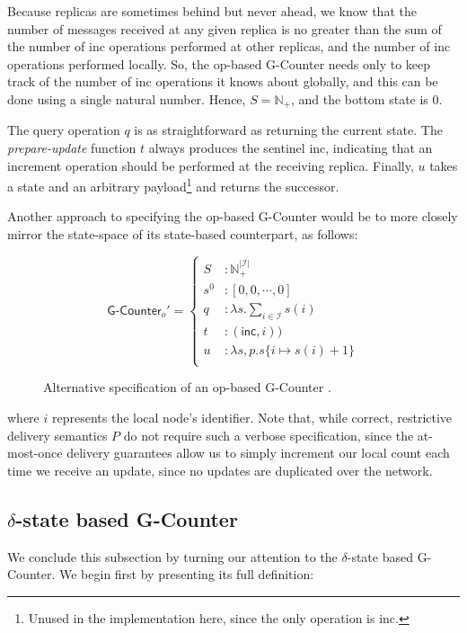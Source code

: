 Because replicas are sometimes behind but never ahead, we know that the number
of messages received at any given replica is no greater than the sum of the
number of \textsf{inc} operations performed at other replicas, and the number of
\textsf{inc} operations performed locally. So, the op-based G-Counter needs only
to keep track of the number of \textsf{inc} operations it knows about globally,
and this can be done using a single natural number. Hence, $S = \mathbb{N}_+$,
and the bottom state is $0$.

The query operation $q$ is as straightforward as returning the current state.
The \emph{prepare-update} function $t$ always produces the sentinel
\textsf{inc}, indicating that an increment operation should be performed at the
receiving replica. Finally, $u$ takes a state and an arbitrary
payload\footnote{Unused in the implementation here, since the only operation is
\textsf{inc}.} and returns the successor.

Another approach to specifying the op-based G-Counter \CRDT would be to more
closely mirror the state-space of its state-based counterpart, as follows:

\begin{figure}[H]
  \centering
  \[
    \textsf{G-Counter}_o' = \left\{\begin{aligned}
      S &: \mathbb{N}_+^{|\mathcal{I}|} \\
      s^0 &: [ 0, 0, \cdots, 0 ] \\
      q &: \lambda s. \sum_{i \in \mathcal{I}} s(i) \\
      t &: (\textsf{inc}, i)) \\
      u &: \lambda s,p. s\{ i \mapsto s(i) + 1 \} \\
    \end{aligned}\right.
  \]
  \caption{Alternative specification of an op-based \textsf{G-Counter} \CRDT.}
\end{figure}

where $i$ represents the local node's identifier. Note that, while correct,
restrictive delivery semantics $P$ do not require such a verbose specification,
since the at-most-once delivery guarantees allow us to simply increment our
local count each time we receive an update, since no updates are duplicated over
the network.

\subsection{$\delta$-state based G-Counter}
We conclude this subsection by turning our attention to the $\delta$-state based
G-Counter. We begin first by presenting its full definition:

